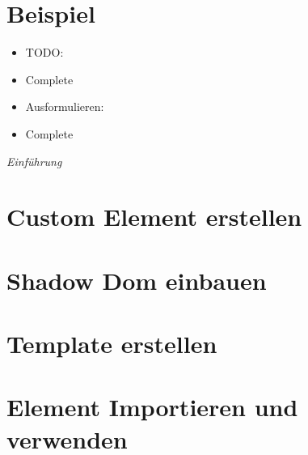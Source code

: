 \section{Beispiel}\label{beispiel}

\begin{itemize}
\item
  TODO:
\item
  Complete
\item
  Ausformulieren:
\item
  Complete
\end{itemize}

\emph{Einführung}

\section{Custom Element erstellen}\label{custom-element-erstellen}

\section{Shadow Dom einbauen}\label{shadow-dom-einbauen}

\section{Template erstellen}\label{template-erstellen}

\section{Element Importieren und
verwenden}\label{element-importieren-und-verwenden}
